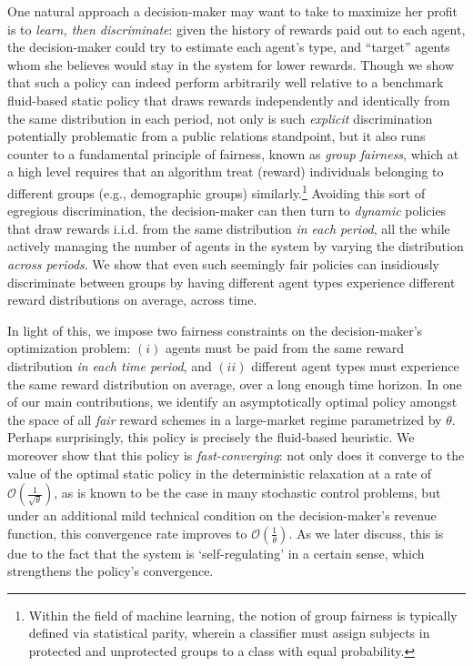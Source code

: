 \documentclass[12pt]{article}
\begin{document}
One natural approach a decision-maker may want to take to maximize her profit is to {\it learn, then discriminate}: given the history of rewards paid out to each agent, the decision-maker could try to estimate each agent's type, and ``target'' agents whom she believes would stay in the system for lower rewards. Though we show that such a policy can indeed perform arbitrarily well relative to a benchmark fluid-based static policy that draws rewards independently and identically from the same distribution in each period, not only is such {\it explicit} discrimination potentially problematic from a public relations standpoint, but it also runs counter to a fundamental principle of fairness, known as {\it  group fairness}, which at a high level requires that an algorithm treat (reward) individuals belonging to different groups (e.g., demographic groups) similarly.\footnote{Within the field of machine learning, the notion of group fairness is typically defined via statistical parity, wherein a classifier must assign subjects in protected and unprotected groups to a class with equal probability.}
Avoiding this sort of egregious discrimination, the decision-maker can then turn to {\it dynamic} policies that draw rewards i.i.d. from the same distribution {\it in each period}, all the while actively managing the number of agents in the system by varying the distribution {\it across periods}. We show that even such seemingly fair policies can insidiously discriminate between groups by having different agent types experience different reward distributions {on average}, across time. 

In light of this, we impose two fairness constraints on the decision-maker's optimization problem: $(i)$ agents {must} be paid from the same reward distribution {\it in each time period}, and $(ii)$ different agent types must experience the same reward distribution on average, over a long enough time horizon. In one of our main contributions, we identify an asymptotically optimal policy amongst the space of all {\it fair} reward schemes in a large-market regime parametrized by $\theta$. Perhaps surprisingly, this policy is precisely {the fluid-based heuristic}. We moreover show that this policy is {\it fast-converging}: not only does it converge to the value of the optimal static policy in the deterministic relaxation at a rate of $\mathcal{O}(\frac{1}{\sqrt{\theta}})$, as is known to be the case in many stochastic control problems, but under an additional mild technical condition on the decision-maker's revenue function, this convergence rate improves to $\mathcal{O}(\frac{1}{\theta})$. As we later discuss, this is due to the fact that the system is `self-regulating' in a certain sense, {which strengthens} the policy's convergence.
\end{document}
